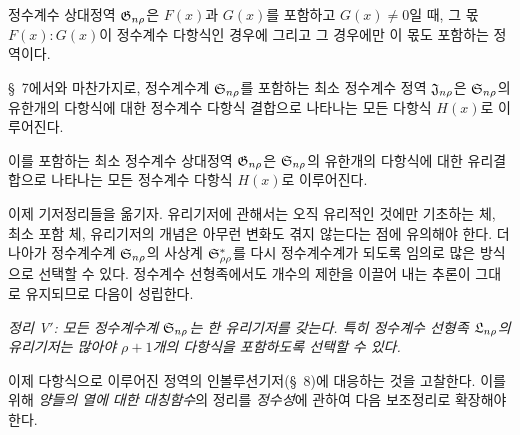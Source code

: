 정수계수 상대정역 $\mathfrak G_{n\rho}$은 $F(x)$과 $G(x)$를 포함하고 $G(x)\ne0$일 때, 그 몫 $F(x):G(x)$이 정수계수 다항식인 경우에 그리고 그 경우에만 이 몫도 포함하는 정역이다.

\S\ 7에서와 마찬가지로, 정수계수계 $\mathfrak S_{n\rho}$를 포함하는 최소 정수계수 정역 $\mathfrak J_{n\rho}$은 $\mathfrak S_{n\rho}$의 유한개의 다항식에 대한 정수계수 다항식 결합으로 나타나는 모든 다항식 $H(x)$로 이루어진다.

이를 포함하는 최소 정수계수 상대정역 $\mathfrak G_{n\rho}$은 $\mathfrak S_{n\rho}$의 유한개의 다항식에 대한 유리결합으로 나타나는 모든 정수계수 다항식 $H(x)$로 이루어진다.

이제 기저정리들을 옮기자. 유리기저에 관해서는 오직 \glqq{}유리적인 것\grqq{}에만 기초하는 체, 최소 포함 체, 유리기저의 개념은 아무런 변화도 겪지 않는다는 점에 유의해야 한다. 더 나아가 정수계수계 $\mathfrak S_{n\rho}$의 사상계 $\mathfrak S^*_{\rho\rho}$를 다시 정수계수계가 되도록 임의로 많은 방식으로 선택할 수 있다. 정수계수 선형족에서도 개수의 제한을 이끌어 내는 추론이 그대로 유지되므로 다음이 성립한다.

\emph{정리 V$'$: 모든 정수계수계 $\mathfrak S_{n\rho}$는 한 유리기저를 갖는다. 특히 정수계수 선형족 $\mathfrak L_{n\rho}$의 유리기저는 많아야 $\rho+1$개의 다항식을 포함하도록 선택할 수 있다.}

이제 다항식으로 이루어진 정역의 인볼루션기저(\S\ 8)에 대응하는 것을 고찰한다. 이를 위해 \emph{양들의 열에 대한 대칭함수}의 정리를 \emph{정수성}에 관하여 다음 보조정리로 확장해야 한다.


